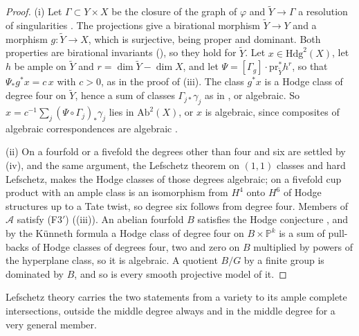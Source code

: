 \documentclass[11pt,reqno]{amsart}
\theoremstyle{plain}
\theoremstyle{definition}
\theoremstyle{remark}
\newcommand{\PP}{\mathbb{P}}
\newcommand{\Hdg}{\mathrm{Hdg}}
\begin{document}
\begin{proof}
(i) Let $\Gamma\subset Y\times X$ be the closure of the graph of $\varphi$
and $\widetilde Y\to\Gamma$ a resolution of singularities \cite{Hir64}. The
projections give a birational morphism $\widetilde Y\to Y$ and a morphism
$g\colon\widetilde Y\to X$, which is surjective, being proper and dominant.
Both properties are birational invariants (),
so they hold for $\widetilde Y$. Let $x\in\Hdg^{2}(X)$, let $h$ be ample on
$\widetilde Y$ and $r=\dim\widetilde Y-\dim X$, and let
$\Psi=[\Gamma_{g}]\cdot\mathrm{pr}_{\widetilde Y}^{*}h^{r}$, so that
$\Psi_{*}g^{*}x=c\,x$ with $c>0$, as in the proof of
(iii). The class $g^{*}x$ is a Hodge class of degree four
on $\widetilde Y$, hence a sum of classes $\Gamma_{j*}\gamma_{j}$ as in
, or algebraic. So $x=c^{-1}\sum_{j}(\Psi\circ
\Gamma_{j})_{*}\gamma_{j}$ lies in $\mathrm{Ab}^{2}(X)$, or $x$ is
algebraic, since composites of algebraic correspondences are algebraic
\cite[Chapter~16]{Ful98}.

(ii) On a fourfold or a fivefold the degrees other than four and six are
settled by (iv), and the same argument, the Lefschetz
theorem on $(1,1)$ classes and hard Lefschetz, makes the Hodge classes of
those degrees algebraic; on a fivefold cup product with an ample class is an
isomorphism from $H^{4}$ onto $H^{6}$ of Hodge structures up to a Tate twist,
so degree six follows from degree four. Members of $\mathcal{A}$ satisfy
\textup{(F3$'$)} ((iii)). An abelian fourfold $B$
satisfies the Hodge conjecture \cite{Mar25a,Mar25b}, and by the K\"unneth
formula a Hodge class of degree four on $B\times\PP^{k}$ is a sum of
pull-backs of Hodge classes of degrees four, two and zero on $B$ multiplied
by powers of the hyperplane class, so it is algebraic. A quotient $B/G$ by a
finite group is dominated by $B$, and so is every smooth projective model of
it.
\end{proof}

Lefschetz theory carries the two statements from a variety to its ample
complete intersections, outside the middle degree always and in the middle
degree for a very general member.
\end{document}
